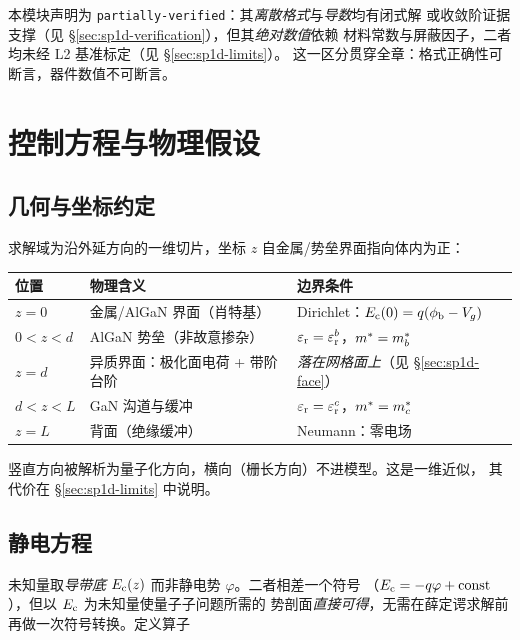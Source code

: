 本模块声明为 \texttt{partially-verified}：其\emph{离散格式}与\emph{导数}均有闭式解
或收敛阶证据支撑（见 \S\ref{sec:sp1d-verification}），但其\emph{绝对数值}依赖
材料常数与屏蔽因子，二者均未经 L2 基准标定（见 \S\ref{sec:sp1d-limits}）。
这一区分贯穿全章：格式正确性可断言，器件数值不可断言。

\section{控制方程与物理假设}
\label{sec:sp1d-model}

\subsection{几何与坐标约定}
\label{sec:sp1d-geometry}

求解域为沿外延方向的一维切片，坐标 $z$ 自金属/势垒界面指向体内为正：

\begin{center}
\small
\begin{tabular}{@{}l l l@{}}
\toprule
\textbf{位置} & \textbf{物理含义} & \textbf{边界条件}\\
\midrule
$z=0$      & 金属/AlGaN 界面（肖特基） & Dirichlet：$E_{\mathrm{c}}(0)=q(\phi_{\mathrm{b}}-V_g)$\\
$0<z<d$    & AlGaN 势垒（非故意掺杂）  & $\varepsilon_{\mathrm{r}}=\varepsilon_{\mathrm{r}}^{b}$，$m^{*}=m^{*}_{b}$\\
$z=d$      & 异质界面：极化面电荷 + 带阶台阶 & \emph{落在网格面上}（见 \S\ref{sec:sp1d-face}）\\
$d<z<L$    & GaN 沟道与缓冲             & $\varepsilon_{\mathrm{r}}=\varepsilon_{\mathrm{r}}^{c}$，$m^{*}=m^{*}_{c}$\\
$z=L$      & 背面（绝缘缓冲）           & Neumann：零电场\\
\bottomrule
\end{tabular}
\end{center}

竖直方向被解析为量子化方向，横向（栅长方向）不进模型。这是一维近似，
其代价在 \S\ref{sec:sp1d-limits} 中说明。

\subsection{静电方程}
\label{sec:sp1d-poisson}

未知量取\emph{导带底} $E_{\mathrm{c}}(z)$ 而非静电势 $\varphi$。二者相差一个符号
（$E_{\mathrm{c}}=-q\varphi+\mathrm{const}$），但以 $E_{\mathrm{c}}$ 为未知量使量子子问题所需的
势剖面\emph{直接可得}，无需在薛定谔求解前再做一次符号转换。定义算子

